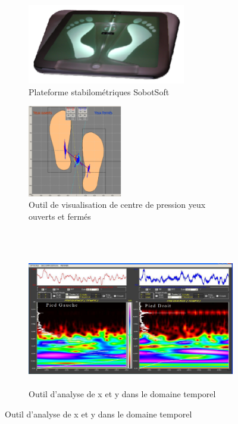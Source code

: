\begin{figure}[H]
    \centering
    \begin{subfigure}[b]{0.45\textwidth}
      \centering
        \includegraphics[height=3.5cm]{images/analyse_marche/SabotSoft1.png}
        \caption{Plateforme stabilométriques SobotSoft}\label{fig:sabotsoft1}
    \end{subfigure}
    \begin{subfigure}[b]{0.5\textwidth}
        \centering
        \includegraphics[height=4cm]{images/analyse_marche/SabotSoft2.png}
        \caption{Outil de visualisation de centre de pression yeux ouverts et fermés}\label{fig:SabotSoft23}
    \end{subfigure}\\
    \begin{subfigure}[b]{0.5\textwidth}
        \hspace{-1.5cm} 
        \includegraphics[height=6cm]{images/analyse_marche/SabotSoft5.png}
        \caption{Outil d'analyse de x et y dans le domaine temporel}\label{fig:SabotSoft5}
    \end{subfigure}
\end{figure}
